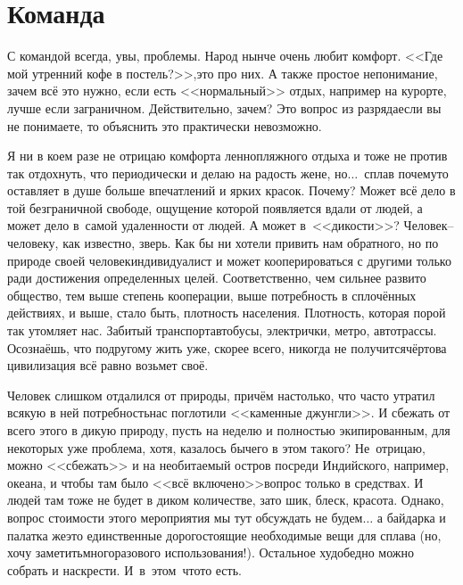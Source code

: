 \chapter{Команда} 

С командой всегда, увы, проблемы. Народ нынче очень любит комфорт. <<Где мой утренний кофе в постель?>>,\mdash это про них. А также простое непонимание, зачем всё это нужно, если есть <<нормальный>> отдых, например на курорте, лучше если заграничном. Действительно, зачем? Это вопрос из разряда\mdash если вы не понимаете, то объяснить это практически невозможно. 

Я ни в коем разе не отрицаю комфорта ленно\sdash пляжного отдыха и тоже не против так отдохнуть, что периодически и делаю на радость жене, но$\ldots$~сплав почему\sdash то оставляет в душе больше впечатлений и ярких красок. Почему? Может всё дело в той безграничной свободе, ощущение которой появляется вдали от людей, а может дело в~самой удаленности от людей. А может в~<<дикости>>? Человек\thinspace--\thinspace человеку, как известно, зверь. Как бы ни хотели привить нам обратного, но по природе своей человек\mdash индивидуалист и может кооперироваться с другими только ради достижения определенных целей. Соответственно, чем сильнее развито общество, тем выше степень кооперации, выше потребность в сплочённых действиях, и выше, стало быть, плотность населения. Плотность, которая порой так утомляет нас. Забитый транспорт\mdash автобусы, электрички, метро, автотрассы. Осознаёшь, что по\sdash другому жить уже, скорее всего, никогда не получится\mdash чёртова цивилизация всё равно возьмет своё.

Человек слишком отдалился от природы, причём настолько, что часто утратил всякую в ней потребность\mdash нас поглотили <<каменные джунгли>>. И сбежать от всего этого в дикую природу, пусть на неделю и полностью экипированным, для некоторых уже проблема, хотя, казалось бы\mdash чего в этом такого? Не~отрицаю, можно <<сбежать>> и на необитаемый остров посреди Индийского, например, океана, и чтобы там было <<всё включено>>\mdash вопрос только в средствах. И людей там тоже не будет в диком количестве, зато шик, блеск, красота. Однако, вопрос стоимости этого мероприятия мы тут обсуждать не будем$\ldots$ а байдарка и палатка же\mdash это единственные дорогостоящие необходимые вещи для сплава (но, хочу заметить\mdash многоразового использования!). Остальное худо\sdash бедно можно собрать и наскрести. И~в~этом~что\sdash то есть. 

